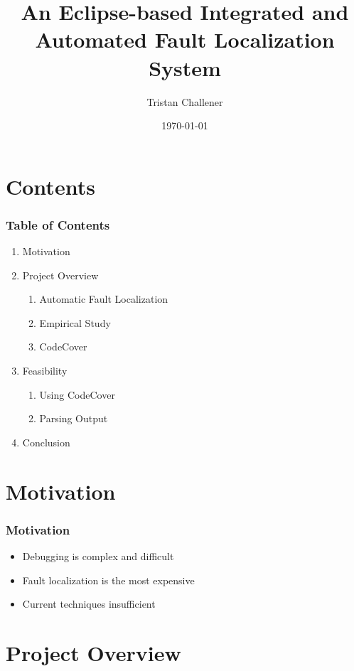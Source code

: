 \documentclass{beamer}
\title{An Eclipse-based Integrated and Automated
Fault Localization System}
\author{Tristan Challener}
\date{\today}
\begin{document}
	\begin{frame}
	\titlepage
	\end{frame}
	
	\section{Contents}
	\begin{frame}
	\frametitle{Table of Contents}
	\begin{enumerate}
	  \item Motivation
	  \item Project Overview
	    \begin{enumerate}
	      \item Automatic Fault Localization
	      \item Empirical Study
	      \item CodeCover
	    \end{enumerate}
	  \item Feasibility
	    \begin{enumerate}
	      \item Using CodeCover
	      \item Parsing Output
	    \end{enumerate}
	  \item Conclusion
	\end{enumerate}
	\end{frame}
	\section{Motivation}
	\begin{frame}
	\frametitle{Motivation}
	\begin{itemize}
	  \item Debugging is complex and difficult
	    \pause
	  \item Fault localization is the most expensive
	    \pause
	  \item Current techniques insufficient
	\end{itemize}
	\end{frame}
	\section{Project Overview}
\end{document}
